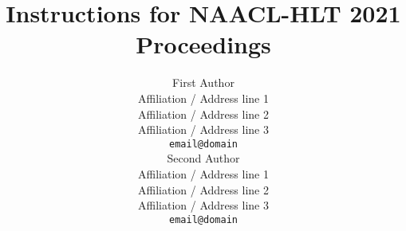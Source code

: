 \documentclass[11pt]{article}
\title{Instructions for NAACL-HLT 2021 Proceedings}
\author{First Author \\
	Affiliation / Address line 1 \\
	Affiliation / Address line 2 \\
	Affiliation / Address line 3 \\
	\texttt{email@domain} \\\And
	Second Author \\
	Affiliation / Address line 1 \\
	Affiliation / Address line 2 \\
	Affiliation / Address line 3 \\
	\texttt{email@domain} \\}
\date{}
\begin{document}
\maketitle


\begin{abstract}
	
\end{abstract}












\appendix


\appendix


\end{document}
